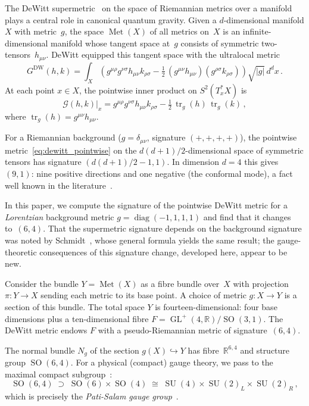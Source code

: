 \documentclass[12pt,a4paper]{article}
\theoremstyle{definition}
\newcommand{\tr}{\operatorname{tr}}
\newcommand{\Met}{\operatorname{Met}}
\newcommand{\GL}{\operatorname{GL}}
\newcommand{\SO}{\operatorname{SO}}
\newcommand{\SU}{\operatorname{SU}}
\newcommand{\diag}{\operatorname{diag}}
\newcommand{\R}{\mathbb{R}}
\begin{document}
The DeWitt supermetric~\cite{DeWitt1967} on the space of Riemannian metrics over a manifold plays a central role in canonical quantum gravity.
Given a $d$-dimensional manifold $X$ with metric~$g$, the space $\Met(X)$ of all metrics on~$X$ is an infinite-dimensional manifold whose tangent space at~$g$ consists of symmetric two-tensors~$h_{\mu\nu}$.
DeWitt equipped this tangent space with the ultralocal metric
\begin{equation}
\label{eq:dewitt}
G^{\mathrm{DW}}(h,k) = \int_X \left( g^{\mu\rho}g^{\nu\sigma} h_{\mu\nu} k_{\rho\sigma} - \tfrac{1}{2}\, (g^{\mu\nu}h_{\mu\nu})(g^{\rho\sigma}k_{\rho\sigma}) \right) \sqrt{|g|}\, d^dx\,.
\end{equation}
At each point $x \in X$, the pointwise inner product on $S^2(T_x^*X)$ is
\begin{equation}
\label{eq:dewitt_pointwise}
\mathcal{G}(h,k)\big|_x = g^{\mu\rho}g^{\nu\sigma} h_{\mu\nu} k_{\rho\sigma} - \tfrac{1}{2}\, \tr_g(h)\, \tr_g(k)\,,
\end{equation}
where $\tr_g(h) = g^{\mu\nu}h_{\mu\nu}$.

For a Riemannian background ($g = \delta_{\mu\nu}$, signature $(+,+,+,+)$), the pointwise metric~\eqref{eq:dewitt_pointwise} on the $d(d{+}1)/2$-dimensional space of symmetric tensors has signature $(d(d{+}1)/2 - 1, 1)$.
In dimension $d = 4$ this gives $(9,1)$: nine positive directions and one negative (the conformal mode), a fact well known in the literature~\cite{Giulini2009,Fischer1970,Isham1976}.

\medskip

In this paper, we compute the signature of the pointwise DeWitt metric for a \emph{Lorentzian} background metric $g = \diag(-1,1,1,1)$ and find that it changes to~$(6,4)$.
That the supermetric signature depends on the background signature was noted by Schmidt~\cite{Schmidt1989}, whose general formula yields the same result; the gauge-theoretic consequences of this signature change, developed here, appear to be new.

Consider the bundle $Y = \Met(X)$ as a fibre bundle over~$X$ with projection $\pi\colon Y \to X$ sending each metric to its base point.
A choice of metric $g\colon X \to Y$ is a section of this bundle.
The total space $Y$ is fourteen-dimensional: four base dimensions plus a ten-dimensional fibre $F = \GL^+(4,\R)/\SO(3,1)$.
The DeWitt metric endows $F$ with a pseudo-Riemannian metric of signature~$(6,4)$.

The normal bundle $N_g$ of the section $g(X) \hookrightarrow Y$ has fibre~$\R^{6,4}$ and structure group $\SO(6,4)$.
For a physical (compact) gauge theory, we pass to the maximal compact
subgroup~\cite{Helgason1978}:
\begin{equation}
\label{eq:PS_chain}
\SO(6,4) \;\supset\; \SO(6) \times \SO(4) \;\cong\; \SU(4) \times \SU(2)_L \times \SU(2)_R\,,
\end{equation}
which is precisely the \emph{Pati-Salam gauge group}~\cite{PatiSalam1974}.
\end{document}
